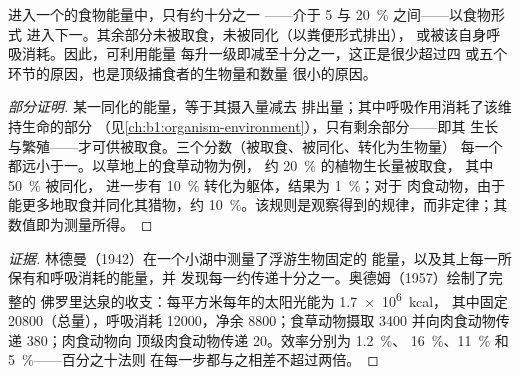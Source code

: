 \begin{theorem}[百分之十法则]\label{thm:b1:ecosystem-organization:lindeman}
进入一个的食物能量中，只有约十分之一
——介于 \qty{5}{} 与 \qty{20}{\%} 之间——以食物形式
进入下一。其余部分未被取食，未被同化（以粪便形式排出），
或被该自身呼吸消耗。因此，可利用能量
每升一级即减至十分之一，这正是很少超过四
或五个环节的原因，也是顶级捕食者的生物量和数量
很小的原因。
\end{theorem}
\begin{proof}[部分证明]
某一同化的能量，等于其摄入量减去
排出量；其中呼吸作用消耗了该维持生命的部分
（见\cref{ch:b1:organism-environment}），只有剩余部分——即其
生长与繁殖——才可供被取食。三个分数（被取食、被同化、转化为生物量）
每一个都远小于一。以草地上的食草动物为例，
约 \qty{20}{\%} 的植物生长量被取食，
其中 \qty{50}{\%} 被同化，
进一步有 \qty{10}{\%} 转化为躯体，结果为 \qty{1}{\%}；对于
肉食动物，由于能更多地取食并同化其猎物，约
\qty{10}{\%}。该规则是观察得到的规律，而非定律；其
数值即为测量所得。
\end{proof}
\begin{proof}[证据]
林德曼（1942）在一个小湖中测量了浮游生物固定的
能量，以及其上每一所保有和呼吸消耗的能量，并
发现每一约传递十分之一。奥德姆（1957）绘制了完整的
佛罗里达泉的收支：每平方米每年的太阳光能为 \qty{1.7e6}{kcal}，
其中固定 \num{20800}（总量），呼吸消耗
\num{12000}，净余 \num{8800}；食草动物摄取 \num{3400}
并向肉食动物传递 \num{380}；肉食动物向
顶级肉食动物传递 \num{20}。效率分别为 \qty{1.2}{\%}、
\qty{16}{\%}、\qty{11}{\%} 和 \qty{5}{\%}——百分之十法则
在每一步都与之相差不超过两倍。
\end{proof}

